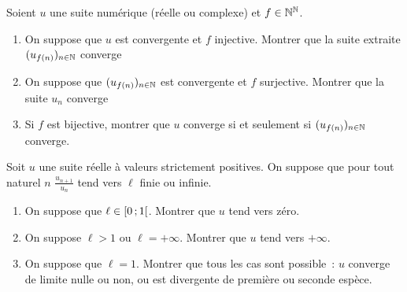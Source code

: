 \begin{exercice}
    Soient \(u\) une suite numérique (réelle ou complexe) et \(f \in 
    \mathbb{N}^{\mathbb{N}}\).
    \begin{enumerate}
        \item On suppose que \(u\) est convergente et \(f\) injective. 
            Montrer que la suite extraite \((u_{f(n)})_{n \in \mathbb{N}}\) converge
        \item On suppose que \((u_{f(n)})_{n \in \mathbb{N}}\) est convergente et 
            \(f\) surjective. Montrer que la suite \(u_n\) converge
        \item Si \(f\) est bijective, montrer que \(u\) converge si et 
            seulement si \((u_{f(n)})_{n \in \mathbb{N}}\) converge.
    \end{enumerate}
\end{exercice}
\begin{exercice}
    Soit \(u\) une suite réelle à valeurs strictement positives. On 
    suppose que pour tout naturel \(n\) \(\frac{u_{n+1}}{u_n}\) tend vers 
    \(\ell\) finie ou infinie.
    \begin{enumerate}
        \item On suppose que \(\ell \in \left[ 0 \, ;  1 \right[\). Montrer que 
            \(u\) tend vers zéro.
        \item On suppose \(\ell > 1\) ou \(\ell = +\infty\). Montrer que 
            \(u\) tend vers \(+\infty\).
        \item On suppose que \(\ell = 1\). Montrer que tous les cas sont 
            possible~: \(u\) converge de limite nulle ou non, ou est 
            divergente de première ou seconde espèce.
    \end{enumerate}
\end{exercice}
